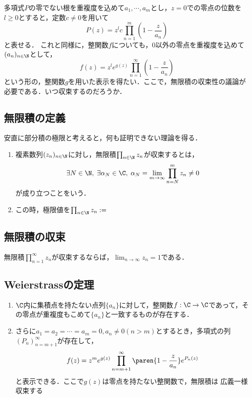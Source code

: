\documentclass[uplatex, dvipdfmx]{jsreport}
\begin{document}
\begin{discussion}
    多項式$P$の零でない根を重複度を込めて$a_1,\cdots,a_m$とし，$z=0$での零点の位数を$l\ge 0$とすると，定数$c\ne 0$を用いて
    \[P(z)=z^lc\prod_{n=1}^m(1-\frac{z}{a_n})\]
    と表せる．
    これと同様に，整関数$f$についても，$0$以外の零点を重複度を込めて$(a_n)_{n\in\N}$として，
    \[f(z)=z^le^{g(z)}\prod_{n=1}^\infty(1-\frac{z}{a_n})\]
    という形の，整関数$g$を用いた表示を得たい．ここで，無限積の収束性の議論が必要である．いつ収束するのだろうか．
\end{discussion}

\subsection{無限積の定義}

\begin{tcolorbox}[colframe=ForestGreen, colback=ForestGreen!10!white, breakable ,colbacktitle=ForestGreen!40!white, coltitle=black,fonttitle=\bfseries\sffamily,
    title=無限積という概念]
    安直に部分積の極限と考えると，何も証明できない理論を得る．
\end{tcolorbox}

\begin{definition}[無限積の収束]\mbox{}
    \begin{enumerate}
        \item 
    複素数列$(z_n)_{n\in\N}$に対し，無限積$\prod_{n\in\N}z_n$が収束するとは，
    \[\exists N\in\N,\;\exists \alpha_N\in\C,\;\alpha_N=\lim_{m\to\infty}\prod_{n=N}^mz_n\ne 0\]
    が成り立つことをいう．
        \item この時，極限値を$\prod_{n\in\N}z_n:=$
    \end{enumerate}
\end{definition}

\subsection{無限積の収束}

\begin{lemma}
    無限積$\prod_{n=1}^\infty z_n$が収束するならば，$\lim_{n\to\infty}z_n=1$である．
\end{lemma}

\subsection{Weierstrassの定理}

\begin{theorem}[Weierstrass]\mbox{}\label{thm-Weierstrass-pre}
    \begin{enumerate}
        \item $\C$内に集積点を持たない点列$\{a_n\}$に対して，整関数$f:\C\to\C$であって，その零点が重複度もこめて$\{a_n\}$と一致するものが存在する．
        \item さらに$a_1=a_2=\cdots=a_m=0,a_n\ne0(n>m)$とするとき，多項式の列$(P_n)_{n=m+1}^\infty$が存在して，\[f(z)=z^me^{g(z)}\prod_{n=m+1}^\infty\paren{1-\frac{z}{a_n}}e^{P_n(z)}\]
        と表示できる．ここで$g(z)$は零点を持たない整関数で，無限積は
        広義一様収束する
    \end{enumerate}
\end{theorem}
\end{document}
